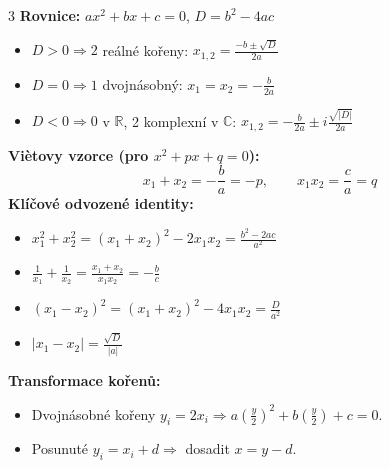 \documentclass[9pt,a4paper]{article}
\begin{document}
\begin{tcolorbox}[secbox,title=OKRUHY 1--3: ALGEBRAICKÉ VÝRAZY, SOUSTAVY ROVNIC A KVADRATICKÉ ROVNICE]
\begin{multicols}{3}
\textbf{Rovnice:} $ax^2 + bx + c = 0$, $D = b^2 - 4ac$
\begin{itemize}
  \item $D > 0 \Rightarrow 2$ reálné kořeny: $x_{1,2} = \frac{-b \pm \sqrt{D}}{2a}$
  \item $D = 0 \Rightarrow 1$ dvojnásobný: $x_1 = x_2 = -\frac{b}{2a}$
  \item $D < 0 \Rightarrow 0$ v $\mathbb{R}$, 2 komplexní v $\mathbb{C}$: $x_{1,2} = -\frac{b}{2a} \pm i \frac{\sqrt{|D|}}{2a}$
\end{itemize}
\textbf{Viètovy vzorce (pro $x^2 + px + q = 0$):}
\[x_1 + x_2 = -\frac{b}{a} = -p, \qquad x_1 x_2 = \frac{c}{a} = q\]
\textbf{Klíčové odvozené identity:}
\begin{itemize}
  \item $x_1^2 + x_2^2 = (x_1+x_2)^2 - 2x_1x_2 = \frac{b^2 - 2ac}{a^2}$
  \item $\frac{1}{x_1} + \frac{1}{x_2} = \frac{x_1 + x_2}{x_1 x_2} = -\frac{b}{c}$
  \item $(x_1 - x_2)^2 = (x_1+x_2)^2 - 4x_1x_2 = \frac{D}{a^2}$
  \item $|x_1 - x_2| = \frac{\sqrt{D}}{|a|}$
\end{itemize}
\textbf{Transformace kořenů:}
\begin{itemize}
  \item Dvojnásobné kořeny $y_i = 2x_i \Rightarrow a\left(\frac{y}{2}\right)^2 + b\left(\frac{y}{2}\right) + c = 0$.
  \item Posunuté $y_i = x_i + d \Rightarrow$ dosadit $x = y - d$.
\end{itemize}

\end{multicols}
\end{tcolorbox}
\end{document}
